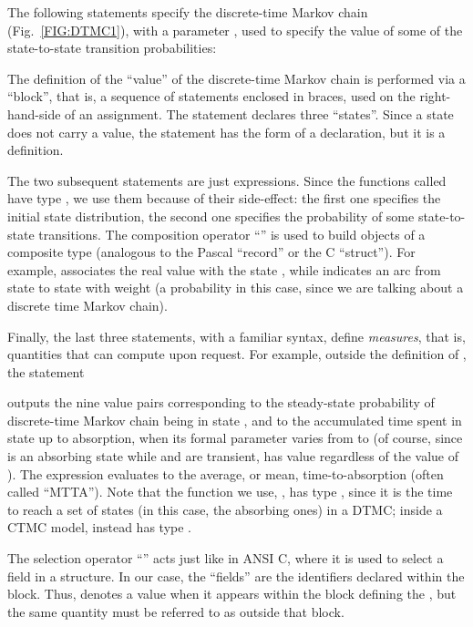 The following statements specify the discrete-time Markov chain
 (Fig.~\ref{FIG:DTMC1}), with a parameter ,
used to specify the value of some of the state-to-state
transition probabilities:
%

%
The definition of the ``value'' of the discrete-time Markov chain
 is performed via a
``block'', that is, a sequence of statements enclosed in braces, used
on the right-hand-side of an assignment.  The statement
 declares three ``states''.
Since a state does not carry a value,
the statement has the form of a declaration, but it is a definition.

The two subsequent statements are just expressions.
Since the functions called have type , we use
them because of their side-effect: the first
one specifies the initial state distribution, the second one
specifies the probability of some state-to-state transitions.  
The composition operator ``\Code{:}'' is used to build objects of a composite
type (analogous to the Pascal ``record'' or the C ``struct'').
For example,  associates the real
value  with the state , while 
indicates an arc from state  to state  with weight 
(a probability in this case, since we are talking about a discrete time
Markov chain).

Finally, the last three statements, with a familiar syntax, define
\emph{measures}, that is, quantities that {\smart} can compute upon request.
For example, outside the definition of , the statement
%

%
outputs the nine value pairs corresponding to the steady-state probability
of discrete-time Markov chain  being in state ,
and to the accumulated time spent in state  up to absorption, when
its formal parameter  varies from  to 
(of course, since  is an absorbing state while 
and  are transient,  has value 
regardless of the value of ).
The expression  evaluates to the average, or mean,
time-to-absorption (often called ``MTTA'').
Note that the function we use, , has type ,
since it is the time to reach a set of states 
(in this case, the absorbing ones)
in a DTMC;
inside a CTMC model,  instead has type .

The selection operator ``'' acts just like in ANSI C, where it
is used to select a field in a structure.  In our case, the ``fields''
are the identifiers declared within the block.
Thus,  denotes a  value when it appears within
the block defining the , but the same quantity must be
referred to as  outside that block.

